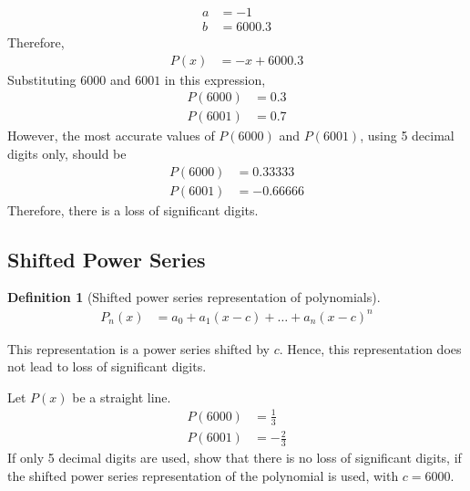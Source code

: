 \documentclass[fleqn, a4paper, 12pt, twoside, titlepage]{article}
\theoremstyle{definition}
\newtheorem{definition}{Definition}
\theoremstyle{theorem}
\begin{document}
\begin{solution}
\begin{align*}
		a &= -1\\
		b &= 6000.3
	\end{align*}
	Therefore,
	\begin{align*}
		P(x) &= -x + 6000.3
	\end{align*}
	Substituting $6000$ and $6001$ in this expression,
	\begin{align*}
		P(6000) &= 0.3\\
		P(6001) &= 0.7
	\end{align*}
	However, the most accurate values of $P(6000)$ and $P(6001)$, using 5 decimal digits only, should be
	\begin{align*}
		P(6000) &= 0.33333\\
		P(6001) &= -0.66666
	\end{align*}
	Therefore, there is a loss of significant digits.
\end{solution}

\subsection{Shifted Power Series}

\begin{definition}[Shifted power series representation of polynomials]
	\begin{align*}
		P_n(x) &= a_0 + a_1 (x - c) + \dots + a_n (x - c)^n
	\end{align*}
\end{definition}

This representation is a power series shifted by $c$.
Hence, this representation does not lead to loss of significant digits.

\begin{question}
	Let $P(x)$ be a straight line.
	\begin{align*}
		P(6000) &= \frac{1}{3}\\
		P(6001) &= -\frac{2}{3}
	\end{align*}
	If only 5 decimal digits are used, show that there is no loss of significant digits, if the shifted power series representation of the polynomial is used, with $c = 6000$.
\end{question}
\end{document}
